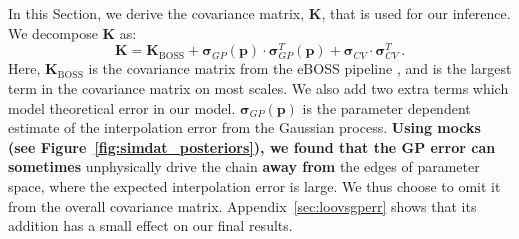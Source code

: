 In this Section, we derive the covariance matrix, $\boldsymbol{K}$, that is used for our inference.
We decompose $\boldsymbol{K}$ as:
\begin{equation}
    \boldsymbol{K} = \boldsymbol{K}_\mathrm{BOSS} + \boldsymbol{\sigma}_{GP}(\boldsymbol{p}) \cdot \boldsymbol{\sigma}_{GP}^T (\boldsymbol{p}) + \boldsymbol{\sigma}_{CV} \cdot \boldsymbol{\sigma}_{CV}^T \,.
    \label{eq:covariance}
\end{equation}
Here, $\boldsymbol{K}_\mathrm{BOSS}$ is the covariance matrix from the eBOSS pipeline \cite{2019JCAP...07..017C}, and is the largest term in the covariance matrix on most scales.
We also add two extra terms which model theoretical error in our model.
$\boldsymbol{\sigma}_{GP}(\boldsymbol{p})$ is the parameter dependent estimate of the interpolation error from the Gaussian process.
\textbf{Using mocks (see Figure~\ref{fig:simdat_posteriors}), we found that the GP error can sometimes} unphysically drive the chain \textbf{away from} the edges of parameter space, where the expected interpolation error is large.
We thus choose to omit it from the overall covariance matrix.
Appendix~\ref{sec:loovsgperr} shows that its addition has a small effect on our final results.

